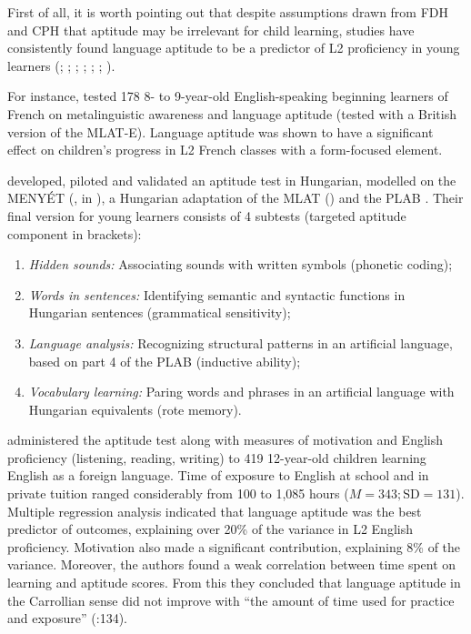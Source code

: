 \documentclass[output=paper]{langscibook}
\begin{document}
First of all, it is worth pointing out that despite assumptions drawn from FDH and CPH that aptitude may be irrelevant for child learning, studies have consistently found language aptitude to be a predictor of L2 proficiency in young learners (\citealt{BialystokFroehlich1978}; \citealt{KissNikolov2005}; \citealt{Kiss2009}; \citealt{SuarezVilagran2010}; \citealt{Munoz2014}; \citealt{TellierRoehrBrackin2017}; \citealt{RoehrBrackinTellier2019}). 

For instance, \citet{TellierRoehrBrackin2017} tested 178 8- to 9-year-old English-speaking beginning learners of French on metalinguistic awareness and language aptitude (tested with a British version of the MLAT-E). Language aptitude was shown to have a significant effect on children’s progress in L2 French classes with a form-focused element. 

\citet{KissNikolov2005} developed, piloted and validated an aptitude test in Hungarian, modelled on the MENYÉT (\citealt{Otto1996}, in \citealt{KissNikolov2005}), a Hungarian adaptation of the MLAT (\citealt{CarrollSapon1959}) and the PLAB \citep{Pimsleur1966}. Their final version for young learners consists of 4 subtests (targeted aptitude component in brackets): 

\begin{enumerate}
\item \textit{Hidden sounds:} Associating sounds with written symbols (phonetic coding);
\item \textit{Words in sentences:} Identifying semantic and syntactic functions in Hungarian sentences (grammatical sensitivity); 
\item \textit{Language analysis:} Recognizing structural patterns in an artificial language, based on part 4 of the PLAB (inductive ability); 
\item \textit{Vocabulary learning:} Paring words and phrases in an artificial language with Hungarian equivalents (rote memory). 
\end{enumerate}

\citet{KissNikolov2005} administered the aptitude test along with measures of motivation and English proficiency (listening, reading, writing) to 419 12-year-old children learning English as a foreign language. Time of exposure to English at school and in private tuition ranged considerably from 100 to 1,085 hours ($M= 343; \text{SD}= 131$). Multiple regression analysis indicated that language aptitude was the best predictor of outcomes, explaining over 20\% of the variance in L2 English proficiency. Motivation also made a significant contribution, explaining 8\% of the variance. Moreover, the authors found a weak correlation between time spent on learning and aptitude scores. From this they concluded that language aptitude in the Carrollian sense did not improve with “the amount of time used for practice and exposure” (\citealt{KissNikolov2005}:134).
\end{document}
